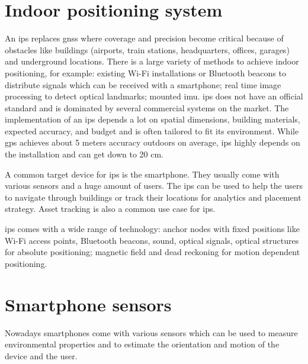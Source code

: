 \section{Indoor positioning system}

An \gls{ips} replaces \gls{gnss} where coverage and precision become critical because of obstacles like buildings (airports, train stations, headquarters, offices, garages) and underground locations. There is a large variety of methods to achieve indoor positioning, for example: existing Wi-Fi installations or Bluetooth beacons to distribute signals which can be received with a smartphone; real time image processing to detect optical landmarks; mounted \gls{imu}. \gls{ips} does not have an official standard and is dominated by several commercial systems on the market. The implementation of an \gls{ips} depends a lot on spatial dimensions, building materials, expected accuracy, and budget and is often tailored to fit its environment. While \gls{gps} achieves about 5 meters accuracy outdoors on average, \gls{ips} highly depends on the installation and can get down to 20 cm.

A common target device for \gls{ips} is the smartphone. They usually come with various sensors and a huge amount of users. The \gls{ips} can be used to help the users to navigate through buildings or track their locations for analytics and placement strategy. Asset tracking is also a common use case for \gls{ips}.

\gls{ips} comes with a wide range of technology: anchor nodes with fixed positions like Wi-Fi access points, Bluetooth beacons, sound, optical signals, optical structures for absolute positioning; magnetic field and dead reckoning for motion dependent positioning.

\section{Smartphone sensors}

Nowadays smartphones come with various sensors which can be used to measure environmental properties and to estimate the orientation and motion of the device and the user.

